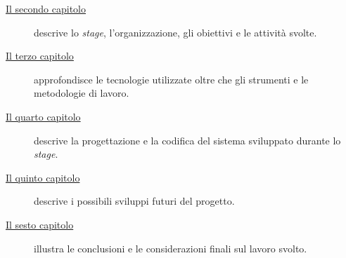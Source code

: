 \begin{description}
    \item[{\hyperref[cap:descrizione-stage]{Il secondo capitolo}}] descrive lo \emph{stage}, l'organizzazione, gli obiettivi e le attività svolte.
    
    \item[{\hyperref[cap:tecnologie]{Il terzo capitolo}}] approfondisce le tecnologie utilizzate oltre che gli strumenti e le metodologie di lavoro.
    
    \item[{\hyperref[cap:progettazione-codifica]{Il quarto capitolo}}] descrive la progettazione e la codifica del sistema sviluppato durante lo \emph{stage}.
    
    \item[{\hyperref[cap:sviluppi-futuri]{Il quinto capitolo}}] descrive i possibili sviluppi futuri del progetto.
    
    \item[{\hyperref[cap:conclusioni]{Il sesto capitolo}}] illustra le conclusioni e le considerazioni finali sul lavoro svolto.
\end{description}